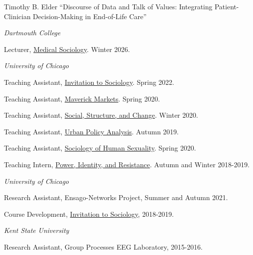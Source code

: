 \documentclass[11pt,article,oneside]{memoir}
\begin{document}
\ind Timothy B. Elder ``Discourse of Data and Talk of Values: Integrating Patient-Clinician Decision-Making in End-of-Life Care'' \\

\newpage

\medskip

\noindent\emph{Dartmouth College \vspace{0.01in}}

\ind Lecturer, \underline{Medical Sociology}. Winter 2026.\vspace{0.05in}

\medskip
\noindent\emph{University of Chicago \vspace{0.01in}}

\ind Teaching Assistant, \underline{Invitation to Sociology}. Spring 2022.

\ind Teaching Assistant, \underline{Maverick Markets}. Spring 2020.

\ind Teaching Assistant, \underline{Social, Structure, and Change}. Winter 2020.

\ind Teaching Assistant, \underline{Urban Policy Analysis}. Autumn 2019.

\ind Teaching Assistant, \underline{Sociology of Human Sexuality}. Spring 2020.

\ind Teaching Intern, \underline{Power, Identity, and Resistance}. Autumn and Winter 2018-2019.

\medskip
\noindent\emph{University of Chicago \vspace{0.01in}}

\ind Research Assistant, Ensago-Networks Project, Summer and Autumn 2021. \vspace{0.05in}

\ind Course Development, \underline{Invitation to Sociology}, 2018-2019. \vspace{0.05in}

\smallskip
\noindent\emph{Kent State University \vspace{0.01in}}

\ind Research Assistant, Group Processes EEG Laboratory, 2015-2016. \vspace{0.1in}
\end{document}
